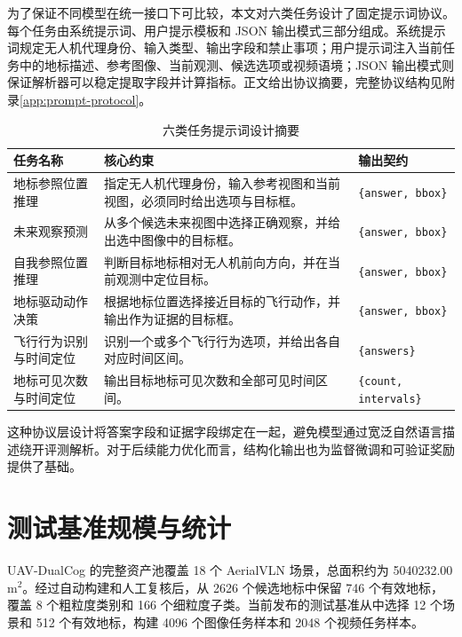 为了保证不同模型在统一接口下可比较，本文对六类任务设计了固定提示词协议。每个任务由系统提示词、用户提示模板和 JSON 输出模式三部分组成。系统提示词规定无人机代理身份、输入类型、输出字段和禁止事项；用户提示词注入当前任务中的地标描述、参考图像、当前观测、候选选项或视频语境；JSON 输出模式则保证解析器可以稳定提取字段并计算指标。正文给出协议摘要，完整协议结构见附录\autoref{app:prompt-protocol}。

\begin{table}[htbp]
    \centering
    \caption{六类任务提示词设计摘要}
    \label{tab:prompt-summary}
    \begin{tabularx}{\textwidth}{p{3.1cm}X p{3.5cm}}
        \toprule
        任务名称 & 核心约束 & 输出契约 \\
        \midrule
        地标参照位置推理 & 指定无人机代理身份，输入参考视图和当前视图，必须同时给出选项与目标框。 & \texttt{\{answer, bbox\}} \\
        未来观察预测 & 从多个候选未来视图中选择正确观察，并给出选中图像中的目标框。 & \texttt{\{answer, bbox\}} \\
        自我参照位置推理 & 判断目标地标相对无人机前向方向，并在当前观测中定位目标。 & \texttt{\{answer, bbox\}} \\
        地标驱动动作决策 & 根据地标位置选择接近目标的飞行动作，并输出作为证据的目标框。 & \texttt{\{answer, bbox\}} \\
        飞行行为识别与时间定位 & 识别一个或多个飞行行为选项，并给出各自对应时间区间。 & \texttt{\{answers\}} \\
        地标可见次数与时间定位 & 输出目标地标可见次数和全部可见时间区间。 & \texttt{\{count, intervals\}} \\
        \bottomrule
    \end{tabularx}
\end{table}

这种协议层设计将答案字段和证据字段绑定在一起，避免模型通过宽泛自然语言描述绕开评测解析。对于后续能力优化而言，结构化输出也为监督微调和可验证奖励提供了基础。

\section{测试基准规模与统计}

UAV-DualCog 的完整资产池覆盖 18 个 AerialVLN 场景，总面积约为 5040232.00 m\(^2\)。经过自动构建和人工复核后，从 2626 个候选地标中保留 746 个有效地标，覆盖 8 个粗粒度类别和 166 个细粒度子类。当前发布的测试基准从中选择 12 个场景和 512 个有效地标，构建 4096 个图像任务样本和 2048 个视频任务样本。

